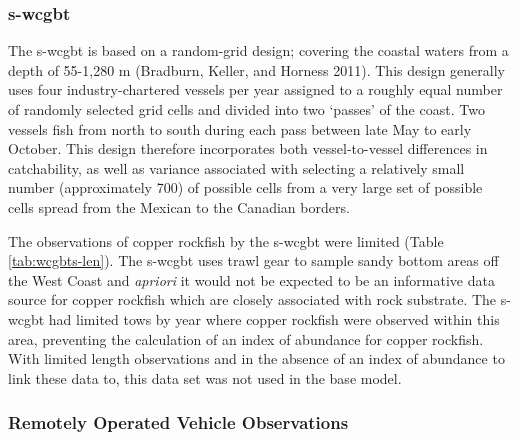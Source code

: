 \documentclass[11pt,
  english,
  a4paper,
]{article}
\begin{document}
\leavevmode\tagmcend\tagstructend\par


\hypertarget{section}{%
\subsubsection{\texorpdfstring{\acrlong{s-wcgbt}}{}}\label{section}}

\leavevmode\tagmcend\tagstructend


The \Gls{s-wcgbt} is based on a random-grid design; covering the coastal waters from a depth of 55-1,280 m {(Bradburn, Keller, and Horness 2011)\leavevmode\tagmcend\tagstructend}. This design generally uses four industry-chartered vessels per year assigned to a roughly equal number of randomly selected grid cells and divided into two `passes' of the coast. Two vessels fish from north to south during each pass between late May to early October. This design therefore incorporates both vessel-to-vessel differences in catchability, as well as variance associated with selecting a relatively small number (approximately 700) of possible cells from a very large set of possible cells spread from the Mexican to the Canadian borders.

\leavevmode\tagmcend\tagstructend\par


The observations of copper rockfish by the \Gls{s-wcgbt} were limited (Table \ref{tab:wcgbts-len}). The \Gls{s-wcgbt} uses trawl gear to sample sandy bottom areas off the West Coast and \emph{apriori} it would not be expected to be an informative data source for copper rockfish which are closely associated with rock substrate. The \Gls{s-wcgbt} had limited tows by year where copper rockfish were observed within this area, preventing the calculation of an index of abundance for copper rockfish. With limited length observations and in the absence of an index of abundance to link these data to, this data set was not used in the base model.

\leavevmode\tagmcend\tagstructend\par


\hypertarget{remotely-operated-vehicle-observations}{%
\subsubsection{Remotely Operated Vehicle Observations}\label{remotely-operated-vehicle-observations}}
\end{document}
